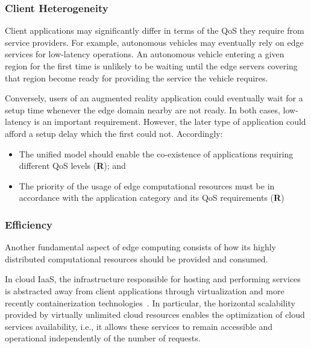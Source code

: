 
\subsubsection{Client Heterogeneity}

Client applications may significantly differ in terms of the QoS they require from service providers. For example, autonomous vehicles may eventually rely on edge services for low-latency operations. An autonomous vehicle entering a given region for the first time is unlikely to be waiting until the edge servers covering that region become ready for providing the service the vehicle requires. 

Conversely, users of an augmented reality application could eventually wait for a setup time whenever the edge domain nearby are not ready. In both cases, low-latency is an important requirement. However, the later type of application could afford a setup delay which the first could not. Accordingly:

\begin{itemize}
	\item The unified model should enable the co-existence of applications requiring different QoS levels (\textbf{R}); and
	
	\item The priority of the usage of edge computational resources must be in accordance with the application category and its QoS requirements (\textbf{R})
\end{itemize}


\subsubsection{Efficiency}

Another fundamental aspect of edge computing consists of how its highly distributed computational resources should be provided and consumed.

In cloud IaaS, the infrastructure responsible for hosting and performing services is abstracted away from client applications through virtualization and more recently containerization technologies~\cite{}. In particular, the horizontal scalability provided by virtually unlimited cloud resources enables the optimization of cloud services availability, i.e., it allows these services to remain accessible and operational independently of the number of requests.

